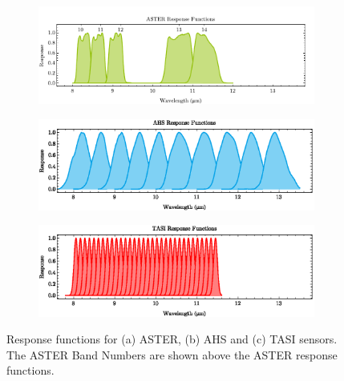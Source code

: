 \begin{figure}[!t]
	\centering
	\vspace{1em}
	\begin{subfigure}[t]{\linewidth}
		\centering
		\includegraphics[scale=1]{pics/Chapter_04/Response_functions_ASTER-eps-converted-to.pdf}
		\caption{}
		\vspace{0.5em}
	\end{subfigure}
	\hspace{1em}
	\begin{subfigure}[t]{\linewidth}
		\centering
		\includegraphics[scale=1]{pics/Chapter_04/Response_functions_AHS.eps}
		\caption{}
		\vspace{0.5em}
	\end{subfigure}
	\hspace{1em}
	\begin{subfigure}[t]{\linewidth}
		\centering
		\includegraphics[scale=1]{pics/Chapter_04/Response_functions_TASI.eps}
		\caption{}
	\end{subfigure}
	\vspace{1 em}
	\caption{Response functions for (a) ASTER, (b) AHS  and (c) TASI sensors. The ASTER Band Numbers are shown above the ASTER response functions. }
	\label{fig:emissivitySpectra_spectra}
\end{figure}

